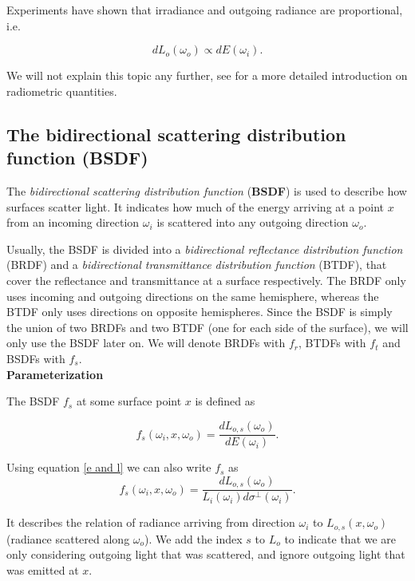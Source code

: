 Experiments have shown that irradiance and outgoing radiance are proportional, i.e. 

\begin{equation*}
dL_o(\omega_o) \propto dE(\omega_i).
\end{equation*}

We will not explain this topic any further, see \cite[chapter 9.3]{veachdiss} for a more detailed introduction on radiometric quantities.\\


\subsection{The bidirectional scattering distribution function (BSDF)}
\label{BSDF}

The \emph{bidirectional scattering distribution function} (\textbf{BSDF}) is used to describe how surfaces scatter light. It indicates how much of the energy arriving at a point $x$ from an incoming direction $\omega_i$ is scattered into any outgoing direction $\omega_o$. 

Usually, the BSDF is divided into a \emph{bidirectional reflectance distribution function} (BRDF) and a \emph{bidirectional transmittance distribution function} (BTDF), that cover the reflectance and transmittance at a surface respectively. The BRDF only uses incoming and outgoing directions on the same hemisphere, whereas the BTDF only uses directions on opposite hemispheres. Since the BSDF is simply the union of two BRDFs and two BTDF (one for each side of the surface), we will only use the BSDF later on. We will denote BRDFs with $f_r$, BTDFs with $f_t$ and BSDFs with $f_s$.\\

\textbf{Parameterization}

The BSDF $f_s$ at some surface point $x$ is defined as

\begin{equation*}
f_s(\omega_i,x,\omega_o) = \frac{dL_{o,s}(\omega_o)}{dE(\omega_i)}.
\end{equation*}

Using equation \ref{e and l} we can also write $f_s$ as
\begin{equation}
\label{scattering1}
f_s(\omega_i,x,\omega_o) = \frac{dL_{o,s}(\omega_o)}{L_i(\omega_i)d\sigma^\bot(\omega_i)}.
\end{equation}

It describes the relation of radiance arriving from direction $\omega_i$ to $L_{o,s}(x,\omega_o)$ (radiance scattered along $\omega_o$). We add the index $s$ to $L_o$ to indicate that we are only considering outgoing light that was scattered, and ignore outgoing light that was emitted at $x$.

